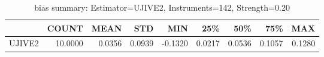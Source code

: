\begin{table}[ht]
\centering
\caption{bias summary: Estimator=UJIVE2, Instruments=142, Strength=0.20}
\begin{tabular}{lrrrrrrrr}
\toprule
 & COUNT & MEAN & STD & MIN & 25\% & 50\% & 75\% & MAX \\
\midrule
UJIVE2 & 10.0000 & 0.0356 & 0.0939 & -0.1320 & 0.0217 & 0.0536 & 0.1057 & 0.1280 \\
\bottomrule
\end{tabular}
\end{table}
